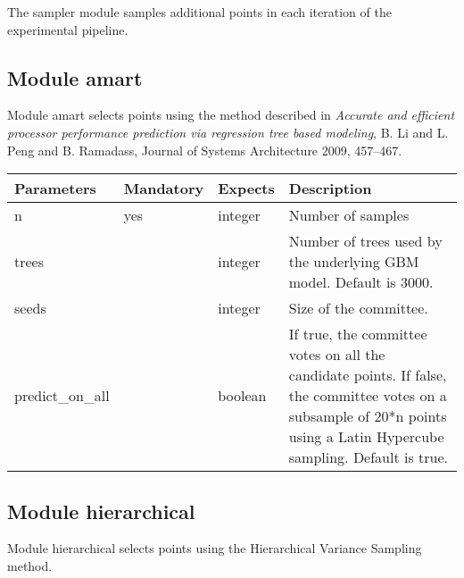 The sampler module samples additional points in each iteration of the experimental pipeline. 

\subsection{Module amart}

Module amart selects points using the method described in \emph{Accurate and efficient processor performance prediction via regression tree based modeling}, B. Li and L. Peng and B. Ramadass, Journal of Systems Architecture 2009, 457--467. 

	\vspace{0.5cm}\begin{tabular}{| p{} | p{} | p{} | p{}  |}
		\hline
		\textbf{ Parameters} & \textbf{ Mandatory} & \textbf{ Expects} & \textbf{ Description} \\ \hline
		 n &  yes &  integer &  Number of samples \\ \hline
		 trees &   &  integer &  Number of trees used by the underlying GBM model. Default is 3000. \\ \hline
		 seeds &   &  integer &  Size of the committee. \\ \hline
		 predict\_on\_all &   &  boolean &  If true, the committee votes on all the candidate points. If false, the committee votes on a subsample of 20*n points using a Latin Hypercube sampling. Default is true. \\ \hline
	\end{tabular}

\subsection{Module hierarchical}

Module hierarchical selects points using the Hierarchical Variance Sampling method.

